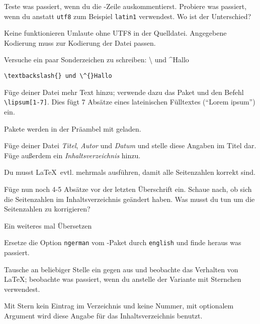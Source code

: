 \begin{uebung}
\item Teste was passiert, wenn du die -Zeile auskommentierst.
    Probiere was passiert, wenn du anstatt \texttt{utf8} zum Beispiel
    \texttt{latin1} verwendest. Wo ist der Unterschied?\label{inputenc}
    \begin{loesung}
        Keine funktionieren Umlaute ohne UTF8 in der Quelldatei. Angegebene Kodierung muss zur Kodierung der Datei passen.
    \end{loesung}
    
\item Versuche ein paar Sonderzeichen zu schreiben: \textbackslash{} und
    \^{}Hallo\label{specialchars}
    \begin{loesung}
        \verb|\textbackslash{} und \^{}Hallo|
    \end{loesung}

\item Füge deiner Datei mehr Text hinzu; verwende dazu das Paket 
	 und den Befehl \verb+\lipsum[1-7]+. Dies fügt
	7 Absätze eines lateinischen Fülltextes (\enquote{Lorem ipsum}) ein.
	\begin{hinweis}
	    Pakete werden in der Präambel mit  geladen.
	\end{hinweis}\label{firststart:last}

\item Füge deiner Datei \emph{Titel}, \emph{Autor} und 
	\emph{Datum} und stelle diese Angaben im Titel dar.
	Füge außerdem ein \emph{Inhaltsverzeichnis} hinzu.
	\begin{hinweis}
	    Du musst \LaTeX\ evtl. mehrmals ausführen, damit alle 
		Seitenzahlen korrekt sind.
	\end{hinweis}\label{markup:first}

\item Füge nun noch 4-5 Absätze vor der letzten Überschrift ein.
    Schaue nach, ob sich die Seitenzahlen im Inhaltsverzeichnis geändert haben.
    Was musst du tun um die Seitenzahlen zu korrigieren?
    \begin{loesung}
        Ein weiteres mal Übersetzen
    \end{loesung}

\item Ersetze die Option \texttt{ngerman} vom -Paket durch
	\texttt{english} und finde heraus was passiert.

\item Tausche an beliebiger Stelle ein  gegen 
	 aus und beobachte das Verhalten von \LaTeX; 
	beobachte was passiert, wenn du  
	anstelle der Variante mit Sternchen verwendest.
	\label{aufg:sectionstar}
	\begin{loesung}
	    Mit Stern kein Eintrag im Verzeichnis und keine Nummer, mit optionalem
	    Argument wird diese Angabe für das Inhaltsverzeichnis benutzt.
	\end{loesung}


\end{uebung}
